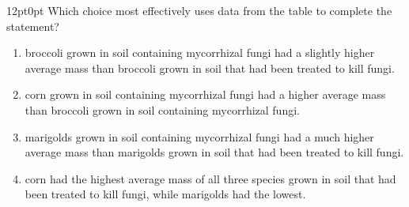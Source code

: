 \documentclass[11pt, twocolumn]{article}
\begin{document}
\begin{minipage}{\columnwidth}
\begin{adjustwidth}{12pt}{0pt}
Which choice most effectively uses data from the table to complete the statement?
\begin{enumerate}[label=\Alph*),leftmargin=18pt,topsep=3pt,itemsep=2pt]
  \item broccoli grown in soil containing mycorrhizal fungi had a slightly higher average mass than broccoli grown in soil that had been treated to kill fungi.
  \item corn grown in soil containing mycorrhizal fungi had a higher average mass than broccoli grown in soil containing mycorrhizal fungi.
  \item marigolds grown in soil containing mycorrhizal fungi had a much higher average mass than marigolds grown in soil that had been treated to kill fungi.
  \item corn had the highest average mass of all three species grown in soil that had been treated to kill fungi, while marigolds had the lowest.
\end{enumerate}
\end{adjustwidth}
\end{minipage}\par
\end{document}
